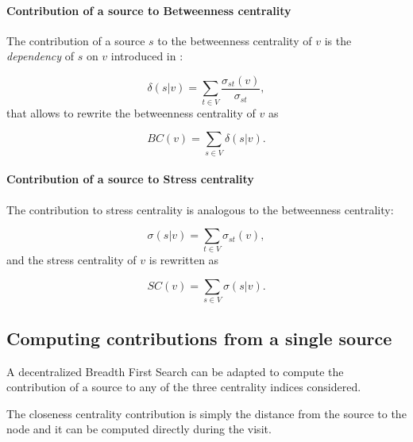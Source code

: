 \paragraph{Contribution of a source to Betweenness centrality}
The contribution of a source $s$ to the betweenness centrality of $v$ is the \emph{dependency} of $s$ on $v$ introduced in \cite{brandes2001}:

\begin{equation}
\delta(s|v) = \sum_{t \in V} \frac{\sigma_{st}(v)}{\sigma_{st}},
\end{equation}
that allows to rewrite the betweenness centrality of $v$ as

\begin{equation}
BC(v) = \sum_{s \in V} \delta(s|v).
\end{equation}

\paragraph{Contribution of a source to Stress centrality}
The contribution to stress centrality is analogous to the betweenness centrality:

\begin{equation} \label{eq:contrib:sc}
\sigma(s|v) = \sum_{t \in V} \sigma_{st}(v),
\end{equation}
and the stress centrality of $v$ is rewritten as

\begin{equation}
SC(v) = \sum_{s \in V} \sigma(s|v).
\end{equation}

\subsection{Computing contributions from a single source}
\label{sec:recursive}

A decentralized Breadth First Search can be adapted to compute the contribution of a source to any of the three centrality indices considered.

The closeness centrality contribution is simply the distance from the source to the node and it can be computed directly during the visit.

